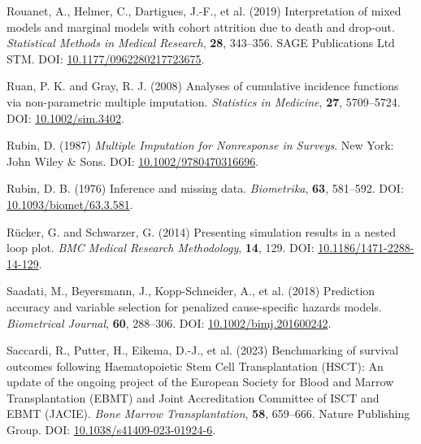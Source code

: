 \documentclass[
  letterpaper,
  paper=240mm:170mm,
  twoside=true,
  open=right,
  fontsize=10pt,
  pagesize=false,
  BCOR=15mm,
  DIV=14,
  headinclude=true,
  footinclude=false,
  headsepline=on]{scrbook}
\newlength{\cslhangindent}
\newenvironment{CSLReferences}[2] %
 {\begin{list}{}{%
  \setlength{\itemindent}{0pt}
  \setlength{\leftmargin}{0pt}
  \setlength{\parsep}{0pt}
  \ifodd #1
   \setlength{\leftmargin}{\cslhangindent}
   \setlength{\itemindent}{-1\cslhangindent}
  \fi
  \setlength{\itemsep}{#2\baselineskip}}}
 {\end{list}}
\begin{document}
\begin{CSLReferences}{1}{1}
Rouanet, A., Helmer, C., Dartigues, J.-F., et al. (2019) Interpretation
of mixed models and marginal models with cohort attrition due to death
and drop-out. \emph{Statistical Methods in Medical Research},
\textbf{28}, 343--356. SAGE Publications Ltd STM. DOI:
\href{https://doi.org/10.1177/0962280217723675}{10.1177/0962280217723675}.

Ruan, P. K. and Gray, R. J. (2008) Analyses of cumulative incidence
functions via non-parametric multiple imputation. \emph{Statistics in
Medicine}, \textbf{27}, 5709--5724. DOI:
\href{https://doi.org/10.1002/sim.3402}{10.1002/sim.3402}.

Rubin, D. (1987) \emph{Multiple Imputation for Nonresponse in Surveys}.
New York: John Wiley \& Sons. DOI:
\href{https://doi.org/10.1002/9780470316696}{10.1002/9780470316696}.

Rubin, D. B. (1976) Inference and missing data. \emph{Biometrika},
\textbf{63}, 581--592. DOI:
\href{https://doi.org/10.1093/biomet/63.3.581}{10.1093/biomet/63.3.581}.

Rücker, G. and Schwarzer, G. (2014) Presenting simulation results in a
nested loop plot. \emph{BMC Medical Research Methodology}, \textbf{14},
129. DOI:
\href{https://doi.org/10.1186/1471-2288-14-129}{10.1186/1471-2288-14-129}.

Saadati, M., Beyersmann, J., Kopp-Schneider, A., et al. (2018)
Prediction accuracy and variable selection for penalized cause-specific
hazards models. \emph{Biometrical Journal}, \textbf{60}, 288--306. DOI:
\href{https://doi.org/10.1002/bimj.201600242}{10.1002/bimj.201600242}.

Saccardi, R., Putter, H., Eikema, D.-J., et al. (2023) Benchmarking of
survival outcomes following {Haematopoietic Stem Cell Transplantation}
({HSCT}): An update of the ongoing project of the {European Society} for
{Blood} and {Marrow Transplantation} ({EBMT}) and {Joint Accreditation
Committee} of {ISCT} and {EBMT} ({JACIE}). \emph{Bone Marrow
Transplantation}, \textbf{58}, 659--666. Nature Publishing Group. DOI:
\href{https://doi.org/10.1038/s41409-023-01924-6}{10.1038/s41409-023-01924-6}.


\end{CSLReferences}
\end{document}

